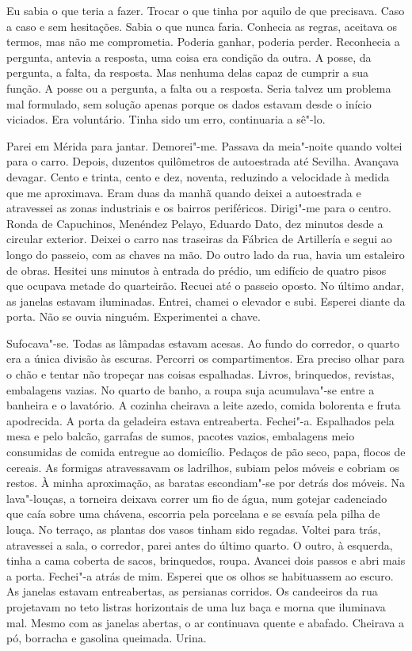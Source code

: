 Eu sabia o que teria a fazer. Trocar o que tinha por aquilo de que
precisava. Caso a caso e sem hesitações. Sabia o que nunca faria.
Conhecia as regras, aceitava os termos, mas não me comprometia. Poderia
ganhar, poderia perder. Reconhecia a pergunta, antevia a resposta, uma
coisa era condição da outra. A posse, da pergunta, a falta, da resposta.
Mas nenhuma delas capaz de cumprir a sua função. A posse ou a pergunta,
a falta ou a resposta. Seria talvez um problema mal formulado, sem
solução apenas porque os dados estavam desde o início viciados. Era
voluntário. Tinha sido um erro, continuaria a sê"-lo.

Parei em Mérida para jantar. Demorei"-me. Passava da meia"-noite quando
voltei para o carro. Depois, duzentos quilômetros de autoestrada até
Sevilha. Avançava devagar. Cento e trinta, cento e dez, noventa,
reduzindo a velocidade à medida que me aproximava. Eram duas da manhã
quando deixei a autoestrada e atravessei as zonas industriais e os
bairros periféricos. Dirigi"-me para o centro. Ronda de Capuchinos,
Menéndez Pelayo, Eduardo Dato, dez minutos desde a circular exterior.
Deixei o carro nas traseiras da Fábrica de Artillería e segui ao longo
do passeio, com as chaves na mão. Do outro lado da rua, havia um
estaleiro de obras. Hesitei uns minutos à entrada do prédio, um edifício
de quatro pisos que ocupava metade do quarteirão. Recuei até o passeio
oposto. No último andar, as janelas estavam iluminadas. Entrei, chamei o
elevador e subi. Esperei diante da porta. Não se ouvia ninguém.
Experimentei a chave.

Sufocava"-se. Todas as lâmpadas estavam acesas. Ao fundo do corredor, o
quarto era a única divisão às escuras. Percorri os compartimentos. Era
preciso olhar para o chão e tentar não tropeçar nas coisas espalhadas.
Livros, brinquedos, revistas, embalagens vazias. No quarto de banho, a
roupa suja acumulava"-se entre a banheira e o lavatório. A cozinha
cheirava a leite azedo, comida bolorenta e fruta apodrecida. A porta da
geladeira estava entreaberta. Fechei"-a. Espalhados pela mesa e pelo
balcão, garrafas de sumos, pacotes vazios, embalagens meio consumidas de
comida entregue ao domicílio. Pedaços de pão seco, papa, flocos de
cereais. As formigas atravessavam os ladrilhos, subiam pelos móveis e
cobriam os restos. À minha aproximação, as baratas escondiam"-se por
detrás dos móveis. Na lava"-louças, a torneira deixava correr um fio de
água, num gotejar cadenciado que caía sobre uma chávena, escorria pela
porcelana e se esvaía pela pilha de louça. No terraço, as plantas dos
vasos tinham sido regadas. Voltei para trás, atravessei a sala, o
corredor, parei antes do último quarto. O outro, à esquerda, tinha a
cama coberta de sacos, brinquedos, roupa. Avancei dois passos e abri
mais a porta. Fechei"-a atrás de mim. Esperei que os olhos se
habituassem ao escuro. As janelas estavam entreabertas, as persianas
corridos. Os candeeiros da rua projetavam no teto listras horizontais
de uma luz baça e morna que iluminava mal. Mesmo com as janelas abertas,
o ar continuava quente e abafado. Cheirava a pó, borracha e gasolina
queimada. Urina.

